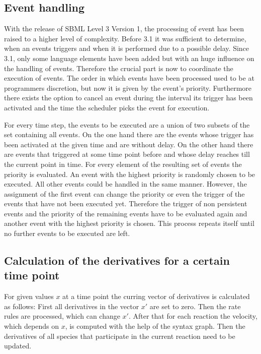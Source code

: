 \documentclass[10pt]{bmc_article}
\newenvironment{bmcformat}{\baselineskip20pt\sloppy\setboolean{publ}{false}}{\baselineskip20pt\sloppy}
\begin{document}
\begin{bmcformat}
\subsection{Event handling}
With the release of SBML Level 3 Version 1, the processing of event has been raised to a higher level of 
complexity. Before 3.1 it was sufficient to determine, when an events triggers and when it is performed 
due to a possible delay. Since 3.1, only some language elements have been added but with an huge 
influence on the handling of events. Therefore the crucial part is now to coordinate the execution of events. 
The order in which events have been processed used to be at programmers discretion, but now it is given 
by the event's priority. Furthermore there exists the option to cancel an event during the interval its trigger 
has been activated and the time the scheduler picks the event for execution. 

For every time step, the events to be executed are a union of two subsets of the set containing all events.
On the one hand there are the events whose trigger has been activated at the given time and are without delay. On the other hand there are events that triggered at some time point before and whose delay reaches till the current point in time. For every element of the resulting set of events the priority is evaluated.
An event with the highest priority is randomly chosen to be executed. All other events
could be handled in the same manner. However, the assignment of the first event can change the priority or even the trigger of the events that have not been executed yet. Therefore the trigger of non persistent 
events and the priority of the remaining events have to be evaluated again and another event with the highest priority is chosen. This process repeats itself until no further events to be executed are left.

\subsection{Calculation of the derivatives for a certain time point}
For given values $x$ at a time point the curring vector of derivatives is calculated as follows: First all derivatives in the vector $x'$ are set to zero. Then the rate rules are processed, which can change $x'$. After that for each reaction the velocity, which depends on $x$, is computed with the help of the syntax graph. Then the derivatives of all species that participate in the current reaction need to be updated.


\end{bmcformat}
\end{document}
